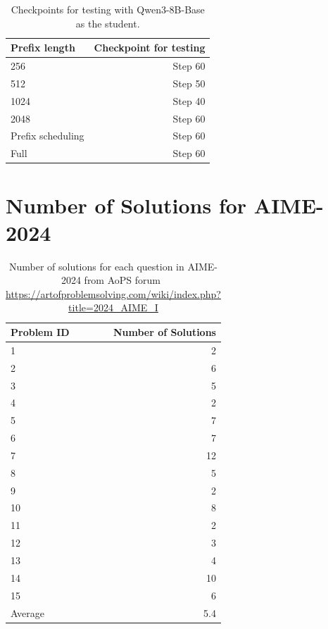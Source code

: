 \documentclass[11pt]{article}
\begin{document}
\begin{table}[h!]  
\centering  
\small  
\begin{tabular}{l|r}  
\hline  
 Prefix length & Checkpoint for testing \\ 
 
\hline
256 & Step 60   \\ 
512 & Step 50   \\ 
1024 & Step 40   \\ 
2048 & Step 60   \\ 
Prefix scheduling & Step 60 \\
Full & Step 60   \\ 
\hline
\end{tabular}  
\caption{Checkpoints for testing with Qwen3-8B-Base as the student.}
\label{tab:early stop 8b}  
\end{table}  


\section{Number of Solutions for AIME-2024}
\label{appendix: aime2024 stats}

\begin{table}[h!]  
\centering  
\small  
\begin{tabular}{l|r}  
\hline  
Problem ID & Number of Solutions \\ 
\hline
1 & 2 \\
2 & 6 \\
3 & 5 \\
4 & 2 \\
5 & 7 \\
6 & 7 \\
7 & 12 \\
8 & 5 \\ 
9 & 2 \\
10 & 8 \\
11 & 2 \\
12 & 3 \\
13 & 4 \\
14 & 10 \\
15 & 6 \\
\hline
Average & 5.4 \\
\hline
\end{tabular}  
\caption{Number of solutions for each question in AIME-2024 from AoPS forum~\url{
https://artofproblemsolving.com/wiki/index.php?title=2024\_AIME\_I
}
}
\label{tab:aime_24_stats}  
\end{table}  
\end{document}
